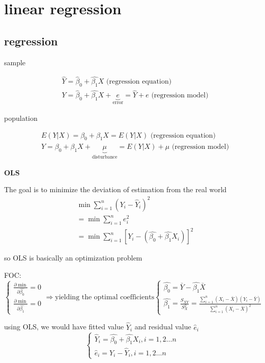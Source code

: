 \documentclass{article}
\begin{document}
\section{linear regression}


\subsection{regression}

sample

\begin{align}
  &\hat Y =\hat \beta_0 +\hat{\beta_{1}}X \text{ (regression equation)}
  \\& Y=\hat \beta_0 +\hat{\beta_{1}}X+
  \underbrace{e}_\text{error}
  =\hat Y + e
  \text{ (regression model)}
\end{align}


population

\begin{align}
& E(Y|X)=\beta_{0}+\beta_{1} X =E(Y|X) \text{ (regression equation)}
\\& Y= \beta_{0}+\beta_{1}X+\underbrace{\mu}_\text{disturbance}=E(Y|X)+\mu \text{ (regression model)}
\end{align}


\textbf{OLS}

The goal is to minimize the deviation of estimation from the real world
\begin{align}
  & \min \sum\limits_{i=1}^n (Y_i-\hat Y_i)^2
  \\& =\min \sum\limits_{i=1}^n e_i^2
  \\& =\min \sum\limits_{i=1}^n [Y_i-(\hat{\beta_{0}}+\hat{\beta_{1}}X_i)]^2
\end{align}

so OLS is basically an optimization problem

FOC:
$\begin{cases}
\frac{\partial \min}{\partial \hat{\beta_{0}}}=0
\\
\frac{\partial \min}{\partial \hat{\beta_{1}}}=0
\end{cases} \Rightarrow
\text{yielding the optimal coefficients}
\begin{cases}
\hat{\beta_{0}}=\bar Y-\hat{\beta_{1}}\bar X
\\
\hat{\beta_{1}}=\frac{S_{XY}}{S^2_X}=\frac{\sum\limits_{i=1}^n (X_i-\bar X)(Y_i-\bar Y)}{\sum\limits_{i=1}^n (X_i-\bar X)^2}
\end{cases}$


using OLS, we would have fitted value $\hat Y_i$ and residual value $\hat e_i$
\begin{equation}
  \begin{cases}
    \hat Y_i=\hat{\beta_{0}}+\hat{\beta_{1}}X_i,i=1,2\dots n
    \\
    \hat e_i=Y_i-\hat Y_i,i=1,2\dots n
  \end{cases}
\end{equation}
\end{document}
